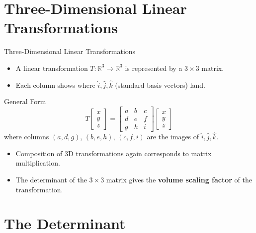 \documentclass[9pt,aspectratio=169]{beamer}
\newcommand{\R}{\mathbb{R}}
\begin{document}
\section{Three-Dimensional Linear Transformations}

\begin{frame}{Three-Dimensional Linear Transformations}
\begin{itemize}
\item A linear transformation $T:\R^3\to\R^3$ is represented by a $3\times 3$ matrix.
\item Each column shows where $\hat{i}, \hat{j}, \hat{k}$ (standard basis vectors) land.
\end{itemize}
\begin{block}{General Form}
$$T\begin{bmatrix}x\\y\\z\end{bmatrix} = \begin{bmatrix}a&b&c\\d&e&f\\g&h&i\end{bmatrix}\begin{bmatrix}x\\y\\z\end{bmatrix}$$
where columns $(a,d,g)$, $(b,e,h)$, $(c,f,i)$ are the images of $\hat i, \hat j, \hat k$.
\end{block}
\begin{itemize}
\item Composition of 3D transformations again corresponds to matrix multiplication.
\item The determinant of the $3\times3$ matrix gives the \textbf{volume scaling factor} of the transformation.
\end{itemize}
\end{frame}

\section{The Determinant}
\end{document}
